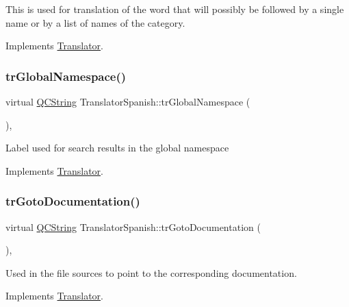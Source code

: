 This is used for translation of the word that will possibly be followed by a single name or by a list of names of the category. 

Implements \mbox{\hyperlink{class_translator}{Translator}}.

\mbox{\label{class_translator_spanish_adeb312a5263227af07b72aaefea4acfa}} 
\subsubsection{\texorpdfstring{trGlobalNamespace()}{trGlobalNamespace()}}
{\footnotesize\ttfamily virtual \mbox{\hyperlink{class_q_c_string}{Q\+C\+String}} Translator\+Spanish\+::tr\+Global\+Namespace (\begin{DoxyParamCaption}{ }\end{DoxyParamCaption})\hspace{0.3cm}{\ttfamily [inline]}, {\ttfamily [virtual]}}

Label used for search results in the global namespace 

Implements \mbox{\hyperlink{class_translator}{Translator}}.

\mbox{\label{class_translator_spanish_a650a3f1c86d8bd23181fc1304d89838a}} 
\subsubsection{\texorpdfstring{trGotoDocumentation()}{trGotoDocumentation()}}
{\footnotesize\ttfamily virtual \mbox{\hyperlink{class_q_c_string}{Q\+C\+String}} Translator\+Spanish\+::tr\+Goto\+Documentation (\begin{DoxyParamCaption}{ }\end{DoxyParamCaption})\hspace{0.3cm}{\ttfamily [inline]}, {\ttfamily [virtual]}}

Used in the file sources to point to the corresponding documentation. 

Implements \mbox{\hyperlink{class_translator}{Translator}}.

\mbox{\label{class_translator_spanish_a72133764f3b9d13b18cc66d9f02b8713}} 
